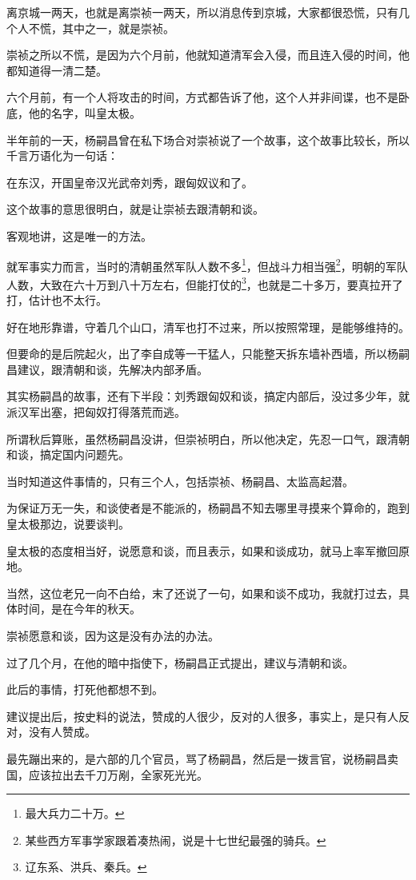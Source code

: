 \begin{multicols}{\theparacolNo}
离京城一两天，也就是离崇祯一两天，所以消息传到京城，大家都很恐慌，只有几个人不慌，其中之一，就是崇祯。

崇祯之所以不慌，是因为六个月前，他就知道清军会入侵，而且连入侵的时间，他都知道得一清二楚。

六个月前，有一个人将攻击的时间，方式都告诉了他，这个人并非间谍，也不是卧底，他的名字，叫皇太极。

半年前的一天，杨嗣昌曾在私下场合对崇祯说了一个故事，这个故事比较长，所以千言万语化为一句话：

在东汉，开国皇帝汉光武帝刘秀，跟匈奴议和了。

这个故事的意思很明白，就是让崇祯去跟清朝和谈。

客观地讲，这是唯一的方法。

就军事实力而言，当时的清朝虽然军队人数不多\footnote{最大兵力二十万。}，但战斗力相当强\footnote{某些西方军事学家跟着凑热闹，说是十七世纪最强的骑兵。}，明朝的军队人数，大致在六十万到八十万左右，但能打仗的\footnote{辽东系、洪兵、秦兵。}，也就是二十多万，要真拉开了打，估计也不太行。

好在地形靠谱，守着几个山口，清军也打不过来，所以按照常理，是能够维持的。

但要命的是后院起火，出了李自成等一干猛人，只能整天拆东墙补西墙，所以杨嗣昌建议，跟清朝和谈，先解决内部矛盾。

其实杨嗣昌的故事，还有下半段：刘秀跟匈奴和谈，搞定内部后，没过多少年，就派汉军出塞，把匈奴打得落荒而逃。

所谓秋后算账，虽然杨嗣昌没讲，但崇祯明白，所以他决定，先忍一口气，跟清朝和谈，搞定国内问题先。

当时知道这件事情的，只有三个人，包括崇祯、杨嗣昌、太监高起潜。

为保证万无一失，和谈使者是不能派的，杨嗣昌不知去哪里寻摸来个算命的，跑到皇太极那边，说要谈判。

皇太极的态度相当好，说愿意和谈，而且表示，如果和谈成功，就马上率军撤回原地。

当然，这位老兄一向不白给，末了还说了一句，如果和谈不成功，我就打过去，具体时间，是在今年的秋天。

崇祯愿意和谈，因为这是没有办法的办法。

过了几个月，在他的暗中指使下，杨嗣昌正式提出，建议与清朝和谈。

此后的事情，打死他都想不到。

建议提出后，按史料的说法，赞成的人很少，反对的人很多，事实上，是只有人反对，没有人赞成。

最先蹦出来的，是六部的几个官员，骂了杨嗣昌，然后是一拨言官，说杨嗣昌卖国，应该拉出去千刀万剐，全家死光光。


\end{multicols}
